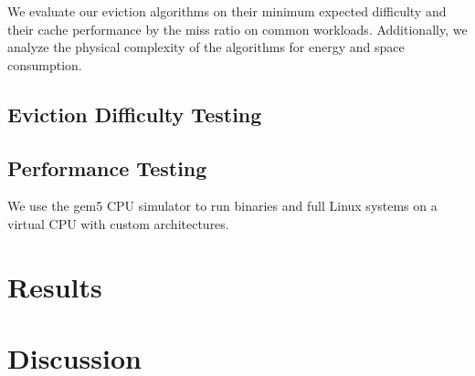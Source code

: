 We evaluate our eviction algorithms on their minimum expected difficulty and their cache performance by the miss ratio on common workloads.
Additionally, we analyze the physical complexity of the algorithms for energy and space consumption.

\subsection{Eviction Difficulty Testing}

\subsection{Performance Testing}

We use the gem5 CPU simulator to run binaries and full Linux systems on a virtual CPU with custom architectures.

\section{Results}

\section{Discussion}









